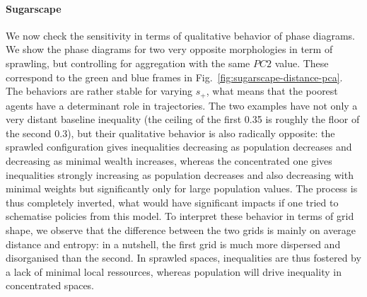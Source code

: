 \documentclass[Royal,sageh,times]{sagej}
\begin{document}
\paragraph{Sugarscape} We now check the sensitivity in terms of qualitative behavior of phase diagrams. We show the phase diagrams for two very opposite morphologies in term of sprawling, but controlling for aggregation with the same $PC2$ value. These correspond to the green and blue frames in Fig.~\ref{fig:sugarscape-distance-pca}. The behaviors are rather stable for varying $s_+$, what means that the poorest agents have a determinant role in trajectories. The two examples have not only a very distant baseline inequality (the ceiling of the first 0.35 is roughly the floor of the second 0.3), but their qualitative behavior is also radically opposite: the sprawled configuration gives inequalities decreasing as population decreases and decreasing as minimal wealth increases, whereas the concentrated one gives inequalities strongly increasing as population decreases and also decreasing with minimal weights but significantly only for large population values. The process is thus completely inverted, what would have significant impacts if one tried to schematise policies from this model. To interpret these behavior in terms of grid shape, we observe that the difference between the two grids is mainly on average distance and entropy: in a nutshell, the first grid is much more dispersed and disorganised than the second. In sprawled spaces, inequalities are thus fostered by a lack of minimal local ressources, whereas population will drive inequality in concentrated spaces.



\end{document}
